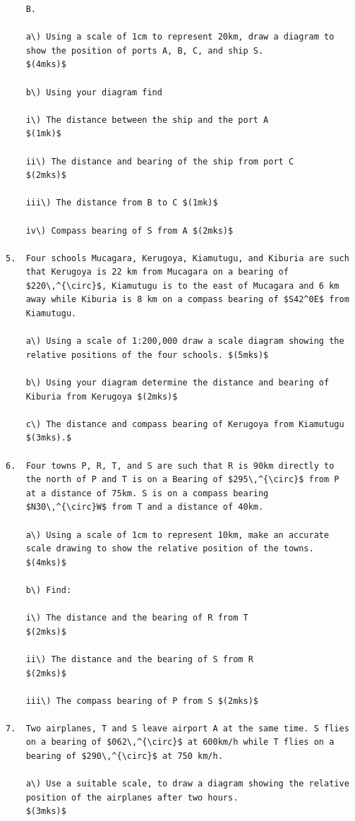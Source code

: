 \documentclass[
  a4paperpaper,
]{scrbook}
\begin{document}
\begin{tcolorbox}
\begin{verbatim}
    B.  

    a\) Using a scale of 1cm to represent 20km, draw a diagram to
    show the position of ports A, B, C, and ship S.
    $(4mks)$

    b\) Using your diagram find

    i\) The distance between the ship and the port A
    $(1mk)$

    ii\) The distance and bearing of the ship from port C
    $(2mks)$

    iii\) The distance from B to C $(1mk)$

    iv\) Compass bearing of S from A $(2mks)$

5.  Four schools Mucagara, Kerugoya, Kiamutugu, and Kiburia are such
    that Kerugoya is 22 km from Mucagara on a bearing of
    $220\,^{\circ}$, Kiamutugu is to the east of Mucagara and 6 km
    away while Kiburia is 8 km on a compass bearing of $S42^0E$ from
    Kiamutugu.

    a\) Using a scale of 1:200,000 draw a scale diagram showing the
    relative positions of the four schools. $(5mks)$

    b\) Using your diagram determine the distance and bearing of
    Kiburia from Kerugoya $(2mks)$

    c\) The distance and compass bearing of Kerugoya from Kiamutugu
    $(3mks).$

6.  Four towns P, R, T, and S are such that R is 90km directly to
    the north of P and T is on a Bearing of $295\,^{\circ}$ from P
    at a distance of 75km. S is on a compass bearing
    $N30\,^{\circ}W$ from T and a distance of 40km.

    a\) Using a scale of 1cm to represent 10km, make an accurate
    scale drawing to show the relative position of the towns.
    $(4mks)$

    b\) Find:

    i\) The distance and the bearing of R from T
    $(2mks)$

    ii\) The distance and the bearing of S from R
    $(2mks)$

    iii\) The compass bearing of P from S $(2mks)$

7.  Two airplanes, T and S leave airport A at the same time. S flies
    on a bearing of $062\,^{\circ}$ at 600km/h while T flies on a
    bearing of $290\,^{\circ}$ at 750 km/h.

    a\) Use a suitable scale, to draw a diagram showing the relative
    position of the airplanes after two hours.
    $(3mks)$


\end{verbatim}
\end{tcolorbox}
\end{document}
